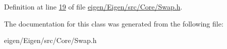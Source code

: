 Definition at line \hyperlink{eigen_2_eigen_2src_2_core_2_swap_8h_source_l00019}{19} of file \hyperlink{eigen_2_eigen_2src_2_core_2_swap_8h_source}{eigen/\+Eigen/src/\+Core/\+Swap.\+h}.



The documentation for this class was generated from the following file\+:\begin{DoxyCompactItemize}
\item 
eigen/\+Eigen/src/\+Core/\+Swap.\+h\end{DoxyCompactItemize}
